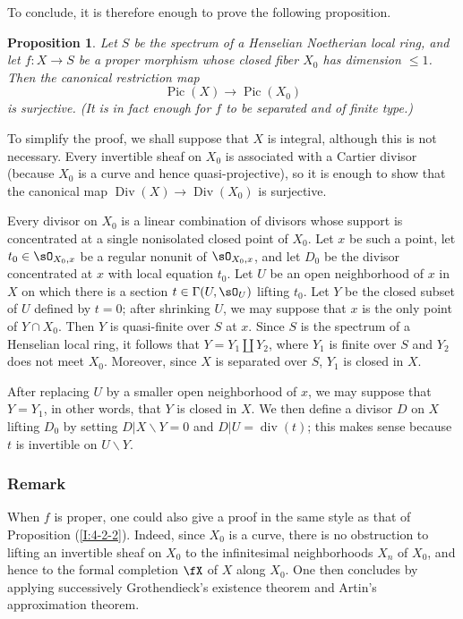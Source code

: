\documentclass[12pt,oneside,english]{smfbook}
\DeclareMathOperator{\dv}{div}
\DeclareMathOperator{\Div}{Div}
\DeclareMathOperator{\pic}{Pic}
\renewcommand{\setminus}{\smallsetminus}
\newtheorem{proposition}[subsubsection]{Proposition}
\begin{document}
To conclude, it is therefore enough to prove the following proposition.

\begin{proposition}\label{I:4-4-1}
Let $S$ be the spectrum of a Henselian Noetherian local ring, and let $f:X\to S$ be a proper morphism whose closed fiber $X_0$ has dimension $\leqslant1$. Then the canonical restriction map
\[
  \pic(X)\to \pic(X_0)
\]
is surjective. (It is in fact enough for $f$ to be \emph{separated} and of finite type.)
\end{proposition}

To simplify the proof, we shall suppose that $X$ is integral, although this is not necessary. Every invertible sheaf on $X_0$ is associated with a Cartier divisor (because $X_0$ is a curve and hence quasi-projective), so it is enough to show that the canonical map $\Div(X)\to\Div(X_0)$ is surjective.

Every divisor on $X_0$ is a linear combination of divisors whose support is concentrated at a single nonisolated closed point of $X_0$. Let $x$ be such a point, let $t_0\in\sO_{X_0,x}$ be a regular nonunit of $\sO_{X_0,x}$, and let $D_0$ be the divisor concentrated at $x$ with local equation $t_0$. Let $U$ be an open neighborhood of $x$ in $X$ on which there is a section $t\in\Gamma(U,\sO_U)$ lifting $t_0$. Let $Y$ be the closed subset of $U$ defined by $t=0$; after shrinking $U$, we may suppose that $x$ is the only point of $Y\cap X_0$. Then $Y$ is quasi-finite over $S$ at $x$. Since $S$ is the spectrum of a Henselian local ring, it follows that $Y=Y_1\amalg Y_2$, where $Y_1$ is finite over $S$ and $Y_2$ does not meet $X_0$. Moreover, since $X$ is separated over $S$, $Y_1$ is closed in $X$.

After replacing $U$ by a smaller open neighborhood of $x$, we may suppose that $Y=Y_1$, in other words, that $Y$ is closed in $X$. We then define a divisor $D$ on $X$ lifting $D_0$ by setting $D|X\setminus Y=0$ and $D|U=\dv(t)$; this makes sense because $t$ is invertible on $U\setminus Y$.

\subsubsection{Remark}\label{I:4-4-2}

When $f$ is proper, one could also give a proof in the same style as that of Proposition (\ref{I:4-2-2}). Indeed, since $X_0$ is a curve, there is no obstruction to lifting an invertible sheaf on $X_0$ to the infinitesimal neighborhoods $X_n$ of $X_0$, and hence to the formal completion $\fX$ of $X$ along $X_0$. One then concludes by applying successively Grothendieck's existence theorem and Artin's approximation theorem.
\end{document}
